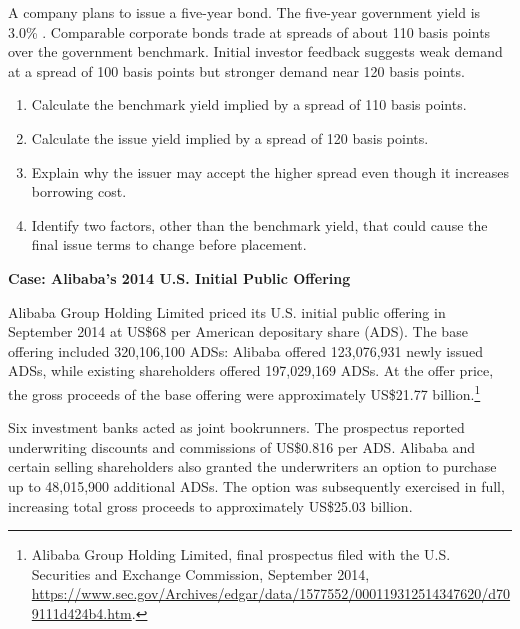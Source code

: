 \begin{enumerate}
A company plans to issue a five-year bond. The five-year government yield is 3.0\% . Comparable corporate bonds trade at spreads of about 110 basis points over the government benchmark. Initial investor feedback suggests weak demand at a spread of 100 basis points but stronger demand near 120 basis points.

\begin{enumerate}

\item Calculate the benchmark yield implied by a spread of 110 basis points.

\item Calculate the issue yield implied by a spread of 120 basis points.

\item Explain why the issuer may accept the higher spread even though it increases borrowing cost.

\item Identify two factors, other than the benchmark yield, that could cause the final issue terms to change before placement.

\end{enumerate}

\end{enumerate}




\textbf{Case: Alibaba's 2014 U.S. Initial Public Offering}

Alibaba Group Holding Limited priced its U.S. initial public offering in September 2014 at US\$68 per American depositary share (ADS). The base offering included 320,106,100 ADSs: Alibaba offered 123,076,931 newly issued ADSs, while existing shareholders offered 197,029,169 ADSs. At the offer price, the gross proceeds of the base offering were approximately US\$21.77 billion.\footnote{Alibaba Group Holding Limited, final prospectus filed with the U.S. Securities and Exchange Commission, September 2014, \url{https://www.sec.gov/Archives/edgar/data/1577552/000119312514347620/d709111d424b4.htm}.}

Six investment banks acted as joint bookrunners. The prospectus reported underwriting discounts and commissions of US\$0.816 per ADS. Alibaba and certain selling shareholders also granted the underwriters an option to purchase up to 48,015,900 additional ADSs. The option was subsequently exercised in full, increasing total gross proceeds to approximately US\$25.03 billion.

